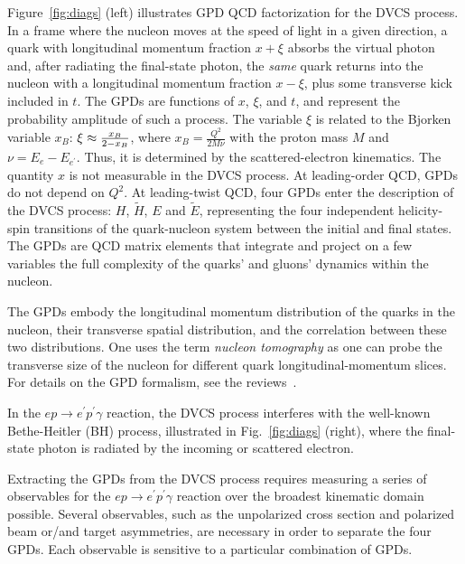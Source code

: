 \documentclass[nofootinbib,twocolumn,showpacs,prl,superscriptaddress,secnumarabic,amssymb,nobibnotes,aps,floatfix]{revtex4-1}
\begin{document}
Figure~\ref{fig:diags} (left) illustrates GPD QCD factorization for the DVCS process.
In a frame where the nucleon moves at the speed of light in a given direction, a quark with 
longitudinal momentum fraction $x+\xi$ absorbs the virtual photon and, after radiating the
final-state photon, the \textit{same} quark returns into the nucleon with a longitudinal momentum
fraction $x-\xi$, plus some transverse kick included in $t$. The GPDs are functions of
$x$, $\xi$, and $t$, and represent the probability amplitude of such a process.
The variable $\xi$ is related to the
Bjorken variable $x_B$: $\xi\approx {{x_B}\over{2-x_B}}$, where $x_B=\frac{Q^2}{2M\nu}$ with
the proton mass $M$ and $\nu=E_e-E_{e^\prime}$.
Thus, it is determined by the scattered-electron kinematics. The quantity $x$ is
not measurable in the DVCS process.
At leading-order QCD, GPDs do not depend on $Q^2$. At leading-twist QCD, four GPDs enter the
description of the DVCS process: $H$, $\tilde H$, $E$ and $\tilde E$, representing the four
independent helicity-spin transitions of the quark-nucleon system between the initial and
final states. The GPDs are QCD matrix elements that integrate and project on a few variables
the full complexity of the quarks' and gluons' dynamics within the nucleon.

The GPDs embody the longitudinal momentum distribution of the quarks in the nucleon,
their transverse spatial distribution, and the correlation between these two distributions.
One uses the term \textit{nucleon tomography} as
one can probe the transverse size of the nucleon for different quark longitudinal-momentum slices.
For details on the GPD formalism, see the
reviews~\cite{Goeke:2001tz,Diehl:2003ny,Ji:2004gf,Belitsky:2005qn,Boffi:2007yc,Guidal:2013rya}.

In the $ep\to e^\prime p^\prime \gamma$ reaction, the DVCS process interferes with the well-known
Bethe-Heitler (BH) process, illustrated in Fig.~\ref{fig:diags} (right), where the final-state
photon is radiated by the incoming or scattered electron.

Extracting the GPDs from the DVCS process requires measuring a series of observables for
the $ep\to e^\prime p^\prime \gamma$ reaction over the broadest
kinematic domain possible. Several
observables, such as the unpolarized cross section and polarized beam or/and target asymmetries, 
are necessary in order to separate the four GPDs. Each 
observable is sensitive to a particular combination of GPDs.
\end{document}
